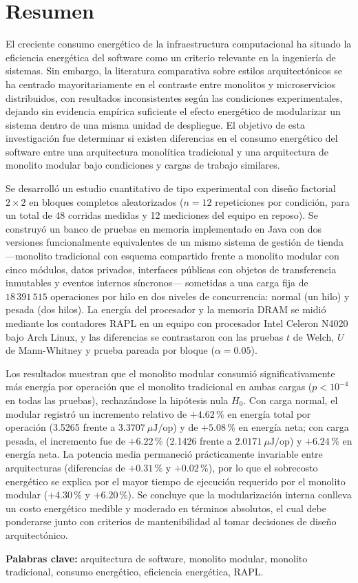 \chapter*{Resumen}

El creciente consumo energético de la infraestructura computacional ha situado la eficiencia energética del software como un criterio relevante en la ingeniería de sistemas. Sin embargo, la literatura comparativa sobre estilos arquitectónicos se ha centrado mayoritariamente en el contraste entre monolitos y microservicios distribuidos, con resultados inconsistentes según las condiciones experimentales, dejando sin evidencia empírica suficiente el efecto energético de modularizar un sistema dentro de una misma unidad de despliegue. El objetivo de esta investigación fue determinar si existen diferencias en el consumo energético del software entre una arquitectura monolítica tradicional y una arquitectura de monolito modular bajo condiciones y cargas de trabajo similares.

Se desarrolló un estudio cuantitativo de tipo experimental con diseño factorial $2 \times 2$ en bloques completos aleatorizados ($n = 12$ repeticiones por condición, para un total de 48 corridas medidas y 12 mediciones del equipo en reposo). Se construyó un banco de pruebas en memoria implementado en Java con dos versiones funcionalmente equivalentes de un mismo sistema de gestión de tienda ---monolito tradicional con esquema compartido frente a monolito modular con cinco módulos, datos privados, interfaces públicas con objetos de transferencia inmutables y eventos internos síncronos--- sometidas a una carga fija de $18\,391\,515$ operaciones por hilo en dos niveles de concurrencia: normal (un hilo) y pesada (dos hilos). La energía del procesador y la memoria DRAM se midió mediante los contadores RAPL en un equipo con procesador Intel Celeron N4020 bajo Arch Linux, y las diferencias se contrastaron con las pruebas $t$ de Welch, $U$ de Mann-Whitney y prueba pareada por bloque ($\alpha = 0.05$).

Los resultados muestran que el monolito modular consumió significativamente más energía por operación que el monolito tradicional en ambas cargas ($p < 10^{-4}$ en todas las pruebas), rechazándose la hipótesis nula $H_0$. Con carga normal, el modular registró un incremento relativo de $+4.62$\,\% en energía total por operación (3.5265 frente a $3.3707~\mu\text{J/op}$) y de $+5.08$\,\% en energía neta; con carga pesada, el incremento fue de $+6.22$\,\% (2.1426 frente a $2.0171~\mu\text{J/op}$) y $+6.24$\,\% en energía neta. La potencia media permaneció prácticamente invariable entre arquitecturas (diferencias de $+0.31$\,\% y $+0.02$\,\%), por lo que el sobrecosto energético se explica por el mayor tiempo de ejecución requerido por el monolito modular ($+4.30$\,\% y $+6.20$\,\%). Se concluye que la modularización interna conlleva un costo energético medible y moderado en términos absolutos, el cual debe ponderarse junto con criterios de mantenibilidad al tomar decisiones de diseño arquitectónico.

\vspace{0.5cm}
\noindent\textbf{Palabras clave:} arquitectura de software, monolito modular, monolito tradicional, consumo energético, eficiencia energética, RAPL.